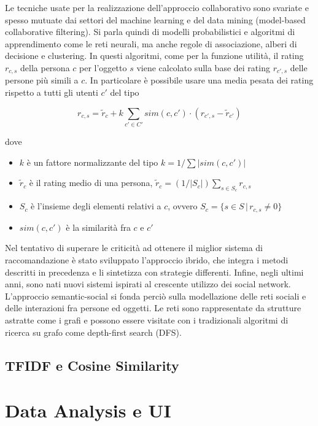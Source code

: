 \documentclass[Lau,binding=0.6cm,noexaminfo]{sapthesis}
\begin{document}
Le tecniche usate per la realizzazione dell'approccio collaborativo sono svariate e spesso mutuate dai settori del machine learning e del data mining (model-based collaborative filtering). Si parla quindi di modelli probabilistici e algoritmi di apprendimento come le reti neurali, ma anche regole di associazione, alberi di decisione e clustering. In questi algoritmi, come per la funzione utilità, il rating $r_{c,s}$ della persona $c$ per l'oggetto $s$ viene calcolato sulla base dei rating $r_{c',s}$ delle persone più simili a $c$. In particolare è possibile usare una media pesata dei rating rispetto a tutti gli utenti $c'$ del tipo

\[
r_{c,s} = \widetilde{r}_c + k \sum_{c' \in C'} sim(c,c') \cdot (r_{c',s} - \widetilde{r}_{c'})
\]

dove

\begin{itemize}
  \item $k$ è un fattore normalizzante del tipo $k = 1 / \sum |sim(c,c')|$
  \item $\widetilde{r}_c$ è il rating medio di una persona, $\widetilde{r}_c = (1/|S_c|) \sum_{s \in S_c} r_{c,s}$
  \item $S_c$ è l'insieme degli elementi relativi a $c$, ovvero $S_c = \{s \in S \, | \, r_{c,s} \neq 0\}$
  \item $sim(c,c')$ è la similarità fra $c$ e $c'$
\end{itemize}

\medskip

Nel tentativo di superare le criticità ad ottenere il miglior sistema di raccomandazione è stato sviluppato l'approccio ibrido, che integra i metodi descritti in precedenza e li sintetizza con strategie differenti. Infine, negli ultimi anni, sono nati nuovi sistemi ispirati al crescente utilizzo dei social network. L'approccio semantic-social si fonda perciò sulla modellazione delle reti sociali e delle interazioni fra persone ed oggetti. Le reti sono rappresentate da strutture astratte come i grafi e possono essere visitate con i tradizionali algoritmi di ricerca su grafo come depth-first search (DFS).\medskip

\section{TFIDF e Cosine Similarity}




\chapter{Data Analysis e UI}
\end{document}
